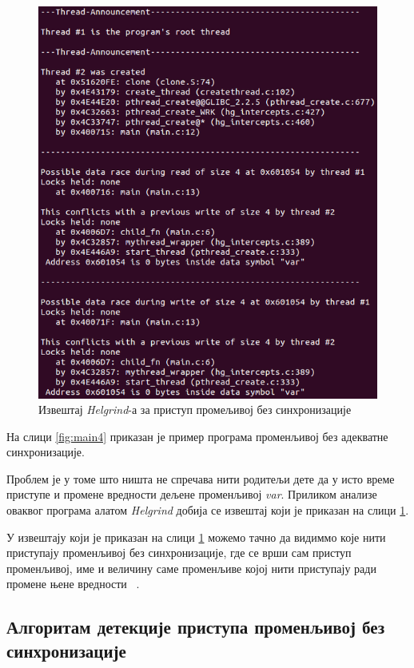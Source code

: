 \documentclass[12pt,oneside]{memoir}
\begin{document}
\begin{figure}[h!]
\begin{center}
\includegraphics[scale=0.75]{slika15.png}
\end{center}
\caption{Извештај \textit{Helgrind}-а за приступ промељивој без синхронизације }
\label{fig:izvestaj}
\end{figure}

\indent На слици \ref{fig:main4} приказан је пример програма променљивој без адекватне синхронизације.

\indent Проблем је у томе што ништа не спречава нити родитељи дете да у исто време приступе и промене вредности дељене променљивој \textit{var}. Приликом анализе оваквог програма алатом \textit{Helgrind} добија се извештај који је приказан на слици \ref{fig:izvestaj}.

\indent У извештају који је приказан на слици \ref{fig:izvestaj} можемо тачно да видиммо које нити приступају променљивој без синхронизације, где се врши сам приступ променљивој, име и величину саме променљиве којој нити приступају ради промене њене вредности ~\cite{helgrindRef}.


\subsection{Алгоритам детекције приступа променљивој без синхронизације}
\end{document}
